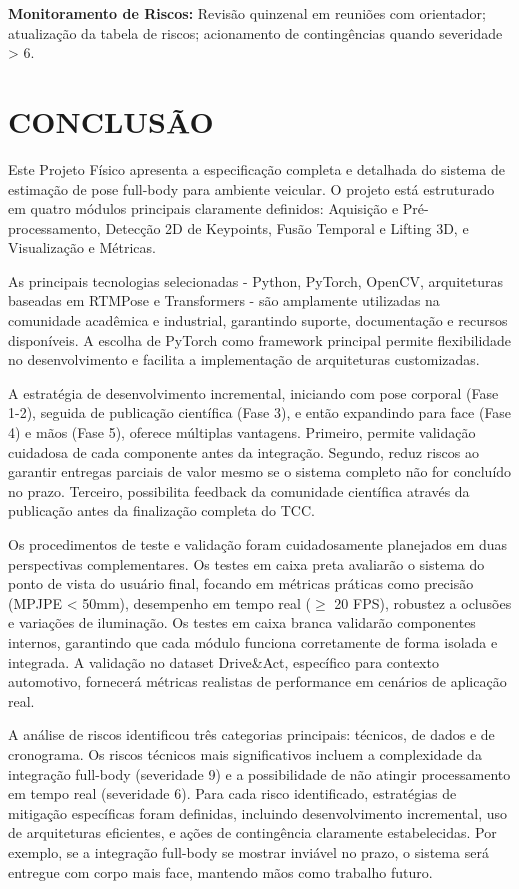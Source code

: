 \documentclass[12pt, a4paper]{article}
\begin{document}
\textbf{Monitoramento de Riscos:} Revisão quinzenal em reuniões com orientador; atualização da tabela de riscos; acionamento de contingências quando severidade > 6.

\section{CONCLUSÃO}

Este Projeto Físico apresenta a especificação completa e detalhada do sistema de estimação de pose full-body para ambiente veicular. O projeto está estruturado em quatro módulos principais claramente definidos: Aquisição e Pré-processamento, Detecção 2D de Keypoints, Fusão Temporal e Lifting 3D, e Visualização e Métricas.

As principais tecnologias selecionadas - Python, PyTorch, OpenCV, arquiteturas baseadas em RTMPose e Transformers - são amplamente utilizadas na comunidade acadêmica e industrial, garantindo suporte, documentação e recursos disponíveis. A escolha de PyTorch como framework principal permite flexibilidade no desenvolvimento e facilita a implementação de arquiteturas customizadas.

A estratégia de desenvolvimento incremental, iniciando com pose corporal (Fase 1-2), seguida de publicação científica (Fase 3), e então expandindo para face (Fase 4) e mãos (Fase 5), oferece múltiplas vantagens. Primeiro, permite validação cuidadosa de cada componente antes da integração. Segundo, reduz riscos ao garantir entregas parciais de valor mesmo se o sistema completo não for concluído no prazo. Terceiro, possibilita feedback da comunidade científica através da publicação antes da finalização completa do TCC.

Os procedimentos de teste e validação foram cuidadosamente planejados em duas perspectivas complementares. Os testes em caixa preta avaliarão o sistema do ponto de vista do usuário final, focando em métricas práticas como precisão (MPJPE < 50mm), desempenho em tempo real ($\geq$ 20 FPS), robustez a oclusões e variações de iluminação. Os testes em caixa branca validarão componentes internos, garantindo que cada módulo funciona corretamente de forma isolada e integrada. A validação no dataset Drive\&Act, específico para contexto automotivo, fornecerá métricas realistas de performance em cenários de aplicação real.

A análise de riscos identificou três categorias principais: técnicos, de dados e de cronograma. Os riscos técnicos mais significativos incluem a complexidade da integração full-body (severidade 9) e a possibilidade de não atingir processamento em tempo real (severidade 6). Para cada risco identificado, estratégias de mitigação específicas foram definidas, incluindo desenvolvimento incremental, uso de arquiteturas eficientes, e ações de contingência claramente estabelecidas. Por exemplo, se a integração full-body se mostrar inviável no prazo, o sistema será entregue com corpo mais face, mantendo mãos como trabalho futuro.
\end{document}
